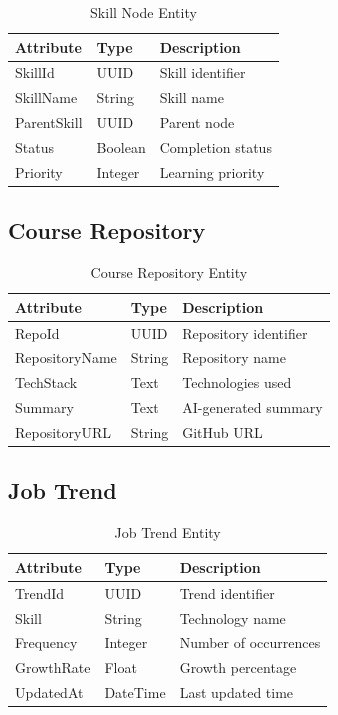 \begin{table}[H]
\centering
\caption{Skill Node Entity}
\begin{tabular}{|l|l|p{8cm}|}
\hline
Attribute & Type & Description \\ \hline
SkillId & UUID & Skill identifier \\ \hline
SkillName & String & Skill name \\ \hline
ParentSkill & UUID & Parent node \\ \hline
Status & Boolean & Completion status \\ \hline
Priority & Integer & Learning priority \\ \hline
\end{tabular}
\end{table}

\subsection{Course Repository}

\begin{table}[H]
\centering
\caption{Course Repository Entity}
\begin{tabular}{|l|l|p{8cm}|}
\hline
Attribute & Type & Description \\ \hline
RepoId & UUID & Repository identifier \\ \hline
RepositoryName & String & Repository name \\ \hline
TechStack & Text & Technologies used \\ \hline
Summary & Text & AI-generated summary \\ \hline
RepositoryURL & String & GitHub URL \\ \hline
\end{tabular}
\end{table}

\subsection{Job Trend}

\begin{table}[H]
\centering
\caption{Job Trend Entity}
\begin{tabular}{|l|l|p{8cm}|}
\hline
Attribute & Type & Description \\ \hline
TrendId & UUID & Trend identifier \\ \hline
Skill & String & Technology name \\ \hline
Frequency & Integer & Number of occurrences \\ \hline
GrowthRate & Float & Growth percentage \\ \hline
UpdatedAt & DateTime & Last updated time \\ \hline
\end{tabular}
\end{table}

